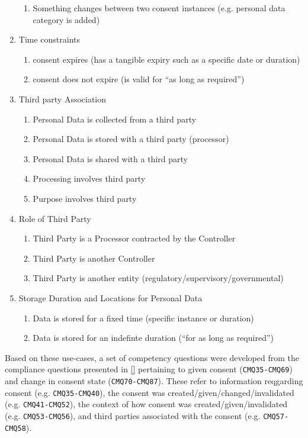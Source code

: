 \begin{enumerate}
  \begin{enumerate}
  \item
    Something changes between two consent instances (e.g. personal data
    category is added)
  \end{enumerate}
\item
  Time constraints

  \begin{enumerate}
  \item
    consent expires (has a tangible expiry such as a specific date or
    duration)
  \item
    consent does not expire (is valid for ``as long as required'')
  \end{enumerate}
\item
  Third party Association

  \begin{enumerate}
  \item
    Personal Data is collected from a third party
  \item
    Personal Data is stored with a third party (processor)
  \item
    Personal Data is shared with a third party
  \item
    Processing involves third party
  \item
    Purpose involves third party
  \end{enumerate}
\item
  Role of Third Party

  \begin{enumerate}
  \item
    Third Party is a Processor contracted by the Controller
  \item
    Third Party is another Controller
  \item
    Third Party is another entity (regulatory/supervisory/governmental)
  \end{enumerate}
\item
  Storage Duration and Locations for Personal Data

  \begin{enumerate}
  \item
    Data is stored for a fixed time (specific instance or duration)
  \item
    Data is stored for an indefinte duration (``for as long as
    required'')
  \end{enumerate}
\end{enumerate}
Based on these use-cases, a set of competency questions were developed from the compliance questions presented in \autoref{} pertaining to given consent (\texttt{CMQ35-CMQ69}) and change in consent state (\texttt{CMQ70-CMQ87}).
These refer to information reqgarding consent (e.g. \texttt{CMQ35-CMQ40}), the consent was created/given/changed/invalidated (e.g. \texttt{CMQ41-CMQ52}), the context of how consent was created/given/invalidated (e.g. \texttt{CMQ53-CMQ56}), and third parties associated with the consent (e.g. \texttt{CMQ57-CMQ58}).

